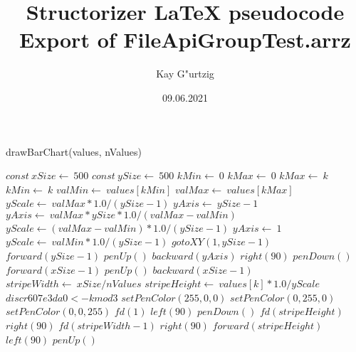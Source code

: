 \documentclass[a4paper,10pt]{article}
\title{Structorizer LaTeX pseudocode Export of FileApiGroupTest.arrz}
\author{Kay G"urtzig}
\date{09.06.2021}
\begin{document}
\begin{algorithm}
\caption{drawBarChart(values, nValues)}
\begin{algorithmic}[5]

\STATE {}
\STATE {}
\STATE {}
\STATE {}
  \STATE \(const\ xSize\gets\ 500\)
  \STATE \(const\ ySize\gets\ 500\)
  \STATE \(kMin\gets\ 0\)
  \STATE \(kMax\gets\ 0\)
      \STATE \(kMax\gets\ k\)
    \ELSE
        \STATE \(kMin\gets\ k\)
      \ENDIF
    \ENDIF
  \ENDFOR
  \STATE \(valMin\gets\ values[kMin]\)
  \STATE \(valMax\gets\ values[kMax]\)
  \STATE \(yScale\gets\ valMax*1.0/(ySize-1)\)
  \STATE \(yAxis\gets\ ySize-1\)
      \STATE \(yAxis\gets\ valMax*ySize*1.0/(valMax-valMin)\)
      \STATE \(yScale\gets(valMax-valMin)*1.0/(ySize-1)\)
    \ELSE
      \STATE \(yAxis\gets\ 1\)
      \STATE \(yScale\gets\ valMin*1.0/(ySize-1)\)
    \ENDIF
  \ENDIF
  \STATE \(gotoXY(1,ySize-1)\)
  \STATE \(forward(ySize-1)\)
  \STATE \(penUp()\)
  \STATE \(backward(yAxis)\)
  \STATE \(right(90)\)
  \STATE \(penDown()\)
  \STATE \(forward(xSize-1)\)
  \STATE \(penUp()\)
  \STATE \(backward(xSize-1)\)
  \STATE \(stripeWidth\gets\ xSize/nValues\)
    \STATE \(stripeHeight\gets\ values[k]*1.0/yScale\)
    \STATE \(discr607e3da0 <- k mod 3\)
      \STATE \(setPenColor(255,0,0)\)
      \STATE \(setPenColor(0,255,0)\)
      \STATE \(setPenColor(0,0,255)\)
    \ENDIF
    \STATE \(fd(1)\)
    \STATE \(left(90)\)
    \STATE \(penDown()\)
    \STATE \(fd(stripeHeight)\)
    \STATE \(right(90)\)
    \STATE \(fd(stripeWidth-1)\)
    \STATE \(right(90)\)
    \STATE \(forward(stripeHeight)\)
    \STATE \(left(90)\)
    \STATE \(penUp()\)
  \ENDFOR

\end{algorithmic}
\end{algorithm}
\end{document}
